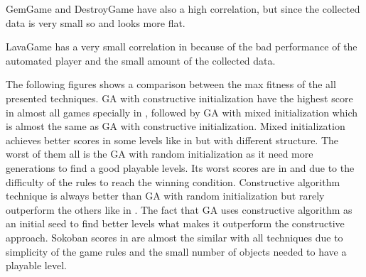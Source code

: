 
GemGame and DestroyGame have also a high correlation, but since the collected data is very small so  and  looks more flat.



LavaGame has a very small correlation in  because of the bad performance of the automated player and the small amount of the collected data.


The following figures shows a comparison between the max fitness of the all presented techniques. GA with constructive initialization have the highest score in almost all games specially in , followed by GA with mixed initialization which is almost the same as GA with constructive initialization. Mixed initialization achieves better scores in some levels like in  but with different structure. The worst of them all is the GA with random initialization as it need more generations to find a good playable levels. Its worst scores are in  and  due to the difficulty of the rules to reach the winning condition. Constructive algorithm technique is always better than GA with random initialization but rarely outperform the others like in . The fact that GA uses constructive algorithm as an initial seed to find better levels what makes it outperform the constructive approach. Sokoban scores in  are almost the similar with all techniques due to simplicity of the game rules and the small number of objects needed to have a playable level.


